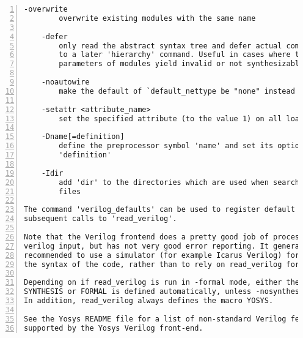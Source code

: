 \begin{lstlisting}[numbers=left,frame=single]
    -overwrite
        overwrite existing modules with the same name

    -defer
        only read the abstract syntax tree and defer actual compilation
        to a later 'hierarchy' command. Useful in cases where the default
        parameters of modules yield invalid or not synthesizable code.

    -noautowire
        make the default of `default_nettype be "none" instead of "wire".

    -setattr <attribute_name>
        set the specified attribute (to the value 1) on all loaded modules

    -Dname[=definition]
        define the preprocessor symbol 'name' and set its optional value
        'definition'

    -Idir
        add 'dir' to the directories which are used when searching include
        files

The command 'verilog_defaults' can be used to register default options for
subsequent calls to 'read_verilog'.

Note that the Verilog frontend does a pretty good job of processing valid
verilog input, but has not very good error reporting. It generally is
recommended to use a simulator (for example Icarus Verilog) for checking
the syntax of the code, rather than to rely on read_verilog for that.

Depending on if read_verilog is run in -formal mode, either the macro
SYNTHESIS or FORMAL is defined automatically, unless -nosynthesis is used.
In addition, read_verilog always defines the macro YOSYS.

See the Yosys README file for a list of non-standard Verilog features
supported by the Yosys Verilog front-end.
\end{lstlisting}


